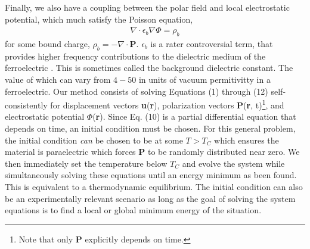\documentclass[16pt]{article} %
\begin{document}
%
Finally, we also have a coupling between the polar field and local electrostatic potential, which much satisfy the Poisson equation,
%
\begin{align}\tag{12}\label{eqn:poisson}
\nabla \cdot \epsilon_b \nabla \Phi = \rho_b
\end{align}
%
for some bound charge, $\rho_b  = - \nabla \cdot \textbf{P}$. $\epsilon_b$ is a rater controversial term, that provides higher frequency contributions to the dielectric medium of the ferroelectric \cite{Baroni2001}.
%
This is sometimes called the background dielectric constant.
%
The value of which can vary from $4 - 50$ \cite{Eliseev2015} in units of vacuum permitivitty in a ferroelectric.
%
Our method consists of solving Equations (1) through (12) self-consistently for displacement vectors \textbf{u}(\textbf{r}), polarization vectors \textbf{P}(\textbf{r}, t)\footnote{Note that only \textbf{P} explicitly depends on time.}, and electrostatic potential $\Phi$(\textbf{r}).
%
Since Eq. (10) is a partial differential equation that depends on time, an initial condition must be chosen.
%
For this general problem, the initial condition \emph{can} be chosen to be at some $T > T_C$ which ensures the material is paraelectric which forces $\textbf{P}$ to be randomly distributed near zero.
%
We then immediately set the temperature below $T_C$ and evolve the system while simultaneously solving these equations until an energy minimum as been found.
%
This is equivalent to a thermodynamic equilibrium. 
%
The initial condition can also be an experimentally relevant scenario as long as the goal of solving the system equations is to find a local or global minimum energy of the situation.
%
\end{document}
